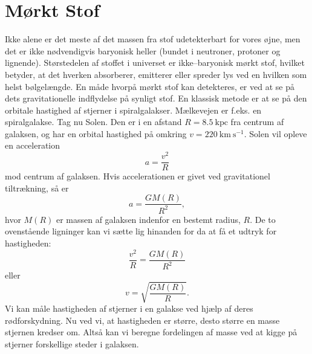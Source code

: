 \section{Mørkt Stof} \label{DM}

Ikke alene er det meste af det massen fra stof udetekterbart for vores øjne, men det er ikke nødvendigvis baryonisk heller (bundet i neutroner, protoner og lignende). Størstedelen af stoffet i universet er ikke--baryonisk mørkt stof, hvilket betyder, at det hverken absorberer, emitterer eller spreder lys ved en hvilken som helst bølgelængde. En måde hvorpå mørkt stof kan detekteres, er ved at se på dets gravitationelle indflydelse på synligt stof. En klassisk metode er at se på den orbitale hastighed af stjerner i spiralgalakser. Mælkevejen er f.eks. en spiralgalakse. Tag nu Solen. Den er i en afstand $R=8.5~\text{kpc}$ fra centrum af galaksen, og har en orbital hastighed på omkring $v=220~\text{km}~\text{s}^{-1}$. Solen vil opleve en acceleration
\begin{equation}
a = \frac{v^2}{R} 
\end{equation}
mod centrum af galaksen. Hvis accelerationen er givet ved gravitationel tiltrækning, så er
\begin{equation}
a = \frac{G M(R)}{R^2},
\end{equation}
hvor $M(R)$ er massen af galaksen indenfor en bestemt radius, $R$. De to ovenstående ligninger kan vi sætte lig hinanden for da at få et udtryk for hastigheden:
\begin{equation}
\frac{v^2}{R} = \frac{G M(R)}{R^2}
\end{equation}
eller
\begin{equation}
v = \sqrt{\frac{G M(R)}{R}}.
\end{equation}
Vi kan måle hastigheden af stjerner i en galakse ved hjælp af deres rødforskydning. Nu ved vi, at hastigheden er større, desto større en masse stjernen kredser om. Altså kan vi beregne fordelingen af masse ved at kigge på stjerner forskellige steder i galaksen.

